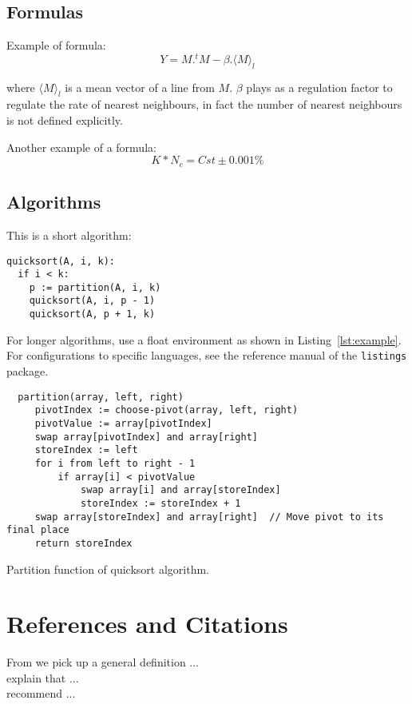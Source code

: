 \documentclass{jdmdh}
\begin{document}
\subsection{Formulas}

Example of formula:
\begin{equation}
  Y=M.^tM-\beta.\langle M \rangle_l
\end{equation}

where $\langle M \rangle_l$ is a mean vector of a line from $M$. $\beta$ plays as a regulation factor to regulate the
rate of nearest neighbours, in fact the number of nearest neighbours is not defined explicitly.

Another example of a formula:
\begin{equation}
  K * N_c = Cst \pm 0.001\%
\end{equation}

\subsection{Algorithms}

This is a short algorithm:
\begin{lstlisting}[numbers=none]
quicksort(A, i, k):
  if i < k:
    p := partition(A, i, k)
    quicksort(A, i, p - 1)
    quicksort(A, p + 1, k)
\end{lstlisting}

For longer algorithms, use a float environment as shown in Listing~\ref{lst:example}. For configurations to specific languages, see the reference manual of the \texttt{listings} package.

\begin{listing}
  \begin{lstlisting}
  partition(array, left, right)
     pivotIndex := choose-pivot(array, left, right)
     pivotValue := array[pivotIndex]
     swap array[pivotIndex] and array[right]
     storeIndex := left
     for i from left to right - 1
         if array[i] < pivotValue
             swap array[i] and array[storeIndex]
             storeIndex := storeIndex + 1
     swap array[storeIndex] and array[right]  // Move pivot to its final place
     return storeIndex
  \end{lstlisting}

  \caption{Partition function of quicksort algorithm.}
  \label{lst:example}
\end{listing}



\section{References and Citations}
From \citet{sinclair91corpus} we pick up a general definition ...\\
\citet{ounis00flidar} explain that ...\\
\citet{wood92artifacts} recommend ...
\end{document}

